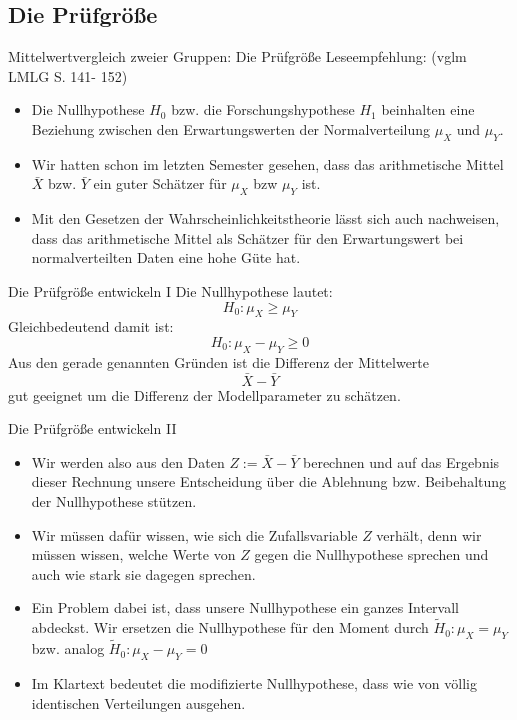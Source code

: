 \documentclass[usenames,dvipsnames,handout]{beamer}
\begin{document}
\subsection{Die Prüfgröße}
\begin{frame}{Mittelwertvergleich zweier Gruppen: Die Prüfgröße}
Leseempfehlung:  (vglm LMLG S. 141- 152)
\begin{itemize}
\item{Die Nullhypothese $H_{0}$ bzw. die Forschungshypothese $H_{1}$ beinhalten eine Beziehung
zwischen den Erwartungswerten der Normalverteilung $\mu_{X}$ und $\mu_{Y}.$}\pause
\item{Wir hatten schon im letzten Semester gesehen, dass das arithmetische Mittel $\bar{X}$ bzw. $\bar{Y}$
ein guter Schätzer für $\mu_{X}$ bzw $\mu_{Y}$ ist.}\pause
\item{Mit den Gesetzen der Wahrscheinlichkeitstheorie lässt sich auch nachweisen, dass das arithmetische Mittel
als Schätzer für den Erwartungswert bei normalverteilten Daten eine hohe Güte hat.}\pause
\end{itemize}
\end{frame}

\begin{frame}{Die Prüfgröße entwickeln I}
Die Nullhypothese lautet: $$H_{0}:  \mu_{X} \geq \mu_{Y}$$ Gleichbedeutend damit ist: $$H_{0}:  \mu_{X} - \mu_{Y} \geq 0$$
Aus den gerade genannten Gründen ist die Differenz der Mittelwerte 
$$\bar{X}-\bar{Y}$$ gut geeignet um die Differenz der Modellparameter zu schätzen.
\end{frame}

\begin{frame}{Die Prüfgröße entwickeln II}
\begin{itemize}
\item{Wir werden also aus den Daten $Z:=\bar{X}-\bar{Y}$ berechnen und auf das Ergebnis dieser Rechnung unsere Entscheidung über die Ablehnung
bzw. Beibehaltung der Nullhypothese stützen.}\pause
\item{Wir müssen dafür wissen, wie sich die Zufallsvariable $Z$ verhält, denn wir müssen wissen, welche Werte von $Z$ gegen die Nullhypothese
sprechen und auch wie stark sie dagegen sprechen.}\pause
\item{Ein Problem dabei ist, dass unsere Nullhypothese ein ganzes Intervall abdeckst. Wir ersetzen die Nullhypothese
für den Moment durch $\tilde{H}_{0}: \mu_{X} = \mu_{Y}$ bzw. analog $\tilde{H}_{0}:  \mu_{X} - \mu_{Y} = 0$}\pause
\item{Im Klartext bedeutet die modifizierte Nullhypothese, dass wie von völlig identischen Verteilungen ausgehen.}
\end{itemize}
\end{frame}
\end{document}

